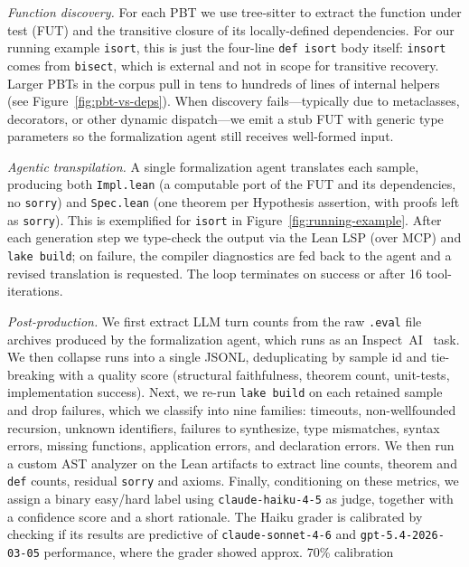 \emph{Function discovery.}\label{sec:pipeline-discovery}
For each PBT we use tree-sitter to extract the function under test
(FUT) and the transitive closure of its locally-defined dependencies. For
our running example \texttt{isort}, this is just the four-line \texttt{def
isort} body itself: \texttt{insort} comes from \texttt{bisect}, which is
external and not in scope for transitive recovery. Larger PBTs in the
corpus pull in tens to hundreds of lines of internal helpers
(see Figure~\ref{fig:pbt-vs-deps}). When discovery fails---typically due
to metaclasses, decorators, or other dynamic dispatch---we emit a stub
FUT with generic type parameters so the formalization agent still
receives well-formed input.

\emph{Agentic transpilation.} A single formalization agent translates each sample, producing both
\texttt{Impl.lean} (a computable port of the FUT and its dependencies, no
\texttt{sorry}) and \texttt{Spec.lean} (one theorem per Hypothesis
assertion, with proofs left as \texttt{sorry}). This is exemplified for \texttt{isort} in 
Figure~\ref{fig:running-example}.
After each generation step we type-check the output via the Lean LSP
(over MCP) and \texttt{lake build}; on failure, the compiler diagnostics
are fed back to the agent and a revised translation is requested. The
loop terminates on success or after 16 tool-iterations.

\emph{Post-production.} We first extract LLM turn counts from the raw \texttt{.eval} file archives produced by the formalization agent, which runs as an  Inspect~AI~\cite{UKAISI_inspect_2024} task. We then collapse runs into a single JSONL, deduplicating by sample id and tie-breaking with a quality score (structural faithfulness, theorem count, unit-tests, implementation success). Next, we re-run
\texttt{lake build} on each retained sample and drop failures, which we classify into nine families: timeouts, non-wellfounded recursion, unknown identifiers, failures to synthesize, type mismatches, syntax errors, missing functions, application errors, and declaration errors. We then run a custom AST analyzer on the Lean artifacts to extract line counts, theorem and \texttt{def} counts, residual  \texttt{sorry} and axioms. Finally, conditioning on these metrics, we assign a binary easy/hard label using \texttt{claude-haiku-4-5} as judge, together with
a confidence score and a short rationale. The Haiku grader is calibrated by checking if its results are predictive of \texttt{claude-sonnet-4-6} and \texttt{gpt-5.4-2026-03-05} performance, where the grader showed approx. 70\% calibration

